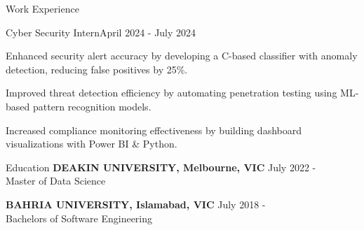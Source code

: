 \documentclass{resume} %
\begin{document}
    \begin{rSection}{Work Experience}
                    \begin{rSubsection}
                {Cyber Security Intern}{April 2024 - July 2024}
                                    {}
                                {}
                                    \item Enhanced security alert accuracy by developing a C{-}based classifier with anomaly detection, reducing false positives by 25\%.
                                    \item Improved threat detection efficiency by automating penetration testing using ML{-}based pattern recognition models.
                                    \item Increased compliance monitoring effectiveness by building dashboard visualizations with Power BI \& Python.
                            \end{rSubsection}
            \end{rSection}

\begin{rSection}{Education}
                        \textbf{DEAKIN UNIVERSITY, Melbourne, VIC} \hfill {July 2022 - } \\
                            {Master of Data Science}
                         
             
         
                        \textbf{BAHRIA UNIVERSITY, Islamabad, VIC} \hfill {July 2018 - } \\
                            {Bachelors of Software Engineering}
                         
             
         
    \end{rSection}
\end{document}

